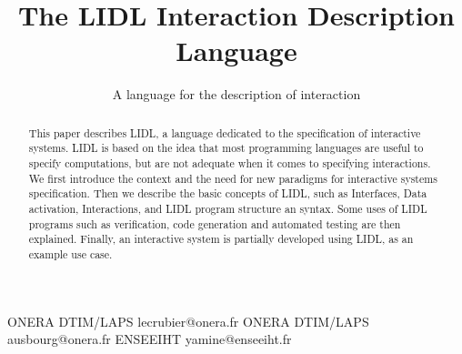 \documentclass[10pt]{sigplanconf}
\begin{document}
\setlength{\pdfpageheight}{\paperheight}
\setlength{\pdfpagewidth}{\paperwidth}






\title{The LIDL Interaction Description Language}
\subtitle{A language for the description of interaction}

           {ONERA DTIM/LAPS}
           {lecrubier@onera.fr}
           {ONERA DTIM/LAPS}
           {ausbourg@onera.fr}
           {ENSEEIHT}
           {yamine@enseeiht.fr}


\maketitle

\begin{abstract}
This paper describes LIDL, a language dedicated to the specification of interactive systems. LIDL is based on the idea that most programming languages are useful to specify computations, but are not adequate when it comes to specifying interactions. We first introduce the context and the need for new paradigms for interactive systems specification. Then we describe the basic concepts of LIDL, such as Interfaces, Data activation, Interactions, and LIDL program structure an syntax. Some uses of LIDL programs such as verification, code generation and automated testing are then explained. Finally, an interactive system is partially developed using LIDL, as an example use case.
  \end{abstract}
\end{document}
